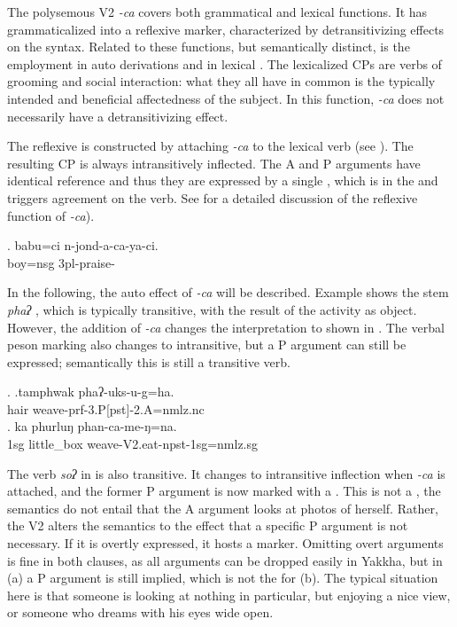 The polysemous V2 \emph{-ca}  covers both grammatical and lexical functions. It has grammaticalized into a reflexive marker, characterized by detransitivizing effects on the syntax. Related to these functions, but semantically distinct, is the employment in auto derivations and in lexical . The lexicalized CPs are verbs of  grooming and social interaction: what  they all have in common is the typically intended and beneficial affectedness of the subject. In this function, \emph{-ca} does not necessarily have a detransitivizing effect.
 
 The reflexive is constructed by attaching  \emph{-ca}  to the lexical verb (see \Next). The resulting CP is always intransitively inflected. The A and P arguments have identical reference and thus they are expressed by a single , which is in the   and triggers agreement on the verb. See  for a detailed discussion of the reflexive function of \emph{-ca}). 
 
 \exg. babu=ci n-jond-a-ca-ya-ci.\\
boy{\sc =nsg} {\sc 3pl}-praise-\\

In the following, the auto effect of \emph{-ca} will be described. Example \Next[a] shows the stem \emph{phaʔ} , which is typically transitive, with  the result of the activity as object. However, the addition of  \emph{-ca} changes the interpretation to  shown in \Next[b]. The verbal peson marking also changes to intransitive, but a P argument can still be expressed; semantically this is still a transitive verb.  

\ex. \ag.tamphwak phaʔ-uks-u-g=ha.\\
		hair weave{\sc -prf-3.P[pst]-2.A=nmlz.nc} \\
\bg. ka phurluŋ phan-ca-me-ŋ=na.\\
		{\sc 1sg} little\_box weave{\sc -V2.eat-npst-1sg=nmlz.sg} \\


The verb \emph{soʔ}  in \Next is also transitive. It changes to intransitive inflection when  \emph{-ca} is attached, and the former P argument is now marked with a  \Next[b]. This is not a , the semantics do not entail that the A argument looks at photos of herself. Rather, the V2 alters the semantics to the effect that a specific P argument is not necessary. If it is overtly expressed, it hosts a   marker. Omitting overt arguments is fine in both clauses, as all arguments can be dropped easily in Yakkha, but in (a) a P argument is still implied, which is not the  for (b). The typical situation here is that someone is looking at nothing in particular, but enjoying a nice view, or someone who dreams with his eyes wide open.

